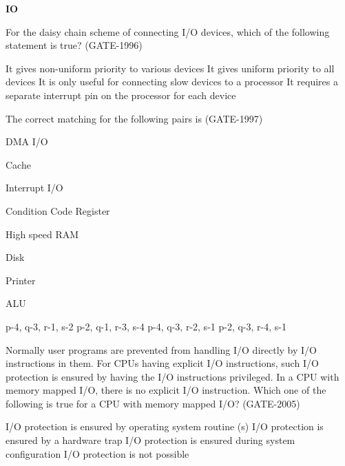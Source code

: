 
\centerline{\textbf{ \LARGE IO }}

\begin{questyle}
  \question  For the daisy chain scheme of connecting I/O devices, which of the following statement is true?  (GATE-1996)

  \begin{choices}
    \CorrectChoice  It gives non-uniform priority to various devices
    \choice         It gives uniform priority to all devices
    \choice         It is only useful for connecting slow devices to a processor
    \choice         It requires a separate interrupt pin on the processor for each device
  \end{choices}
\end{questyle}

\begin{questyle}
  \question  The correct matching for the following pairs is  (GATE-1997)
             \begin{multicols}{2}
                \item[P.] DMA I/O
                \item[Q.] Cache
                \item[R.] Interrupt I/O
                \item[S.] Condition Code Register
                \item[1.] High speed RAM
                \item[2.] Disk
                \item[3.] Printer
                \item[4.] ALU
             \end{multicols}
  \begin{oneparchoices}
    \choice         p-4, q-3, r-1, s-2
    \CorrectChoice  p-2, q-1, r-3, s-4
    \choice         p-4, q-3, r-2, s-1
    \choice         p-2, q-3, r-4, s-1
  \end{oneparchoices}
\end{questyle}


\begin{questyle}
  \question  Normally user programs are prevented from handling I/O directly by I/O instructions in them.
  For CPUs having explicit I/O instructions, such I/O protection is ensured by having the I/O instructions
  privileged. In a CPU with memory mapped I/O, there is no explicit I/O instruction. Which one of the
  following is true for a CPU with memory mapped I/O?  (GATE-2005)

  \begin{choices}
    \CorrectChoice  I/O protection is ensured by operating system routine (s)
    \choice         I/O protection is ensured by a hardware trap
    \choice         I/O protection is ensured during system configuration
    \choice         I/O protection is not possible
  \end{choices}
\end{questyle}

